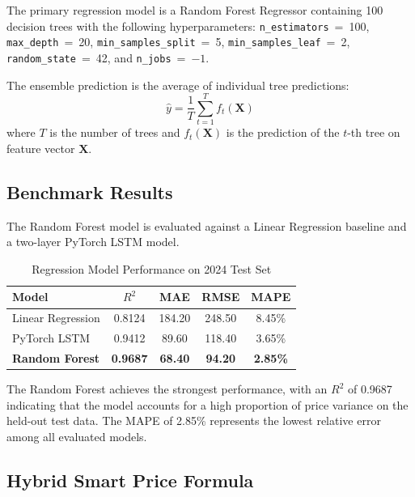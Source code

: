 \documentclass[conference]{IEEEtran}
\begin{document}
The primary regression model is a Random Forest Regressor containing
100 decision trees with the following hyperparameters:
\texttt{n\_estimators}~=~100, \texttt{max\_depth}~=~20,
\texttt{min\_samples\_split}~=~5, \texttt{min\_samples\_leaf}~=~2,
\texttt{random\_state}~=~42, and \texttt{n\_jobs}~=~$-1$.

The ensemble prediction is the average of individual tree predictions:
\begin{equation}
    \hat{y} = \frac{1}{T}\sum_{t=1}^{T} f_t(\mathbf{X})
\end{equation}
where $T$ is the number of trees and $f_t(\mathbf{X})$ is the
prediction of the $t$-th tree on feature vector $\mathbf{X}$.

\subsection{Benchmark Results}

The Random Forest model is evaluated against a Linear Regression
baseline and a two-layer PyTorch LSTM model.

\begin{table}[htbp]
\centering
\caption{Regression Model Performance on 2024 Test Set}
\label{tab:results}
\begin{tabular}{lcccc}
\toprule
\textbf{Model} & $R^2$ & MAE & RMSE & MAPE \\
\midrule
Linear Regression      & 0.8124 & 184.20 & 248.50 & 8.45\% \\
PyTorch LSTM           & 0.9412 &  89.60 & 118.40 & 3.65\% \\
\textbf{Random Forest} & \textbf{0.9687} & \textbf{68.40} &
\textbf{94.20} & \textbf{2.85\%} \\
\bottomrule
\end{tabular}
\end{table}

The Random Forest achieves the strongest performance, with an $R^2$
of 0.9687 indicating that the model accounts for a high proportion
of price variance on the held-out test data. The MAPE of 2.85\%
represents the lowest relative error among all evaluated models.

\subsection{Hybrid Smart Price Formula}
\end{document}
